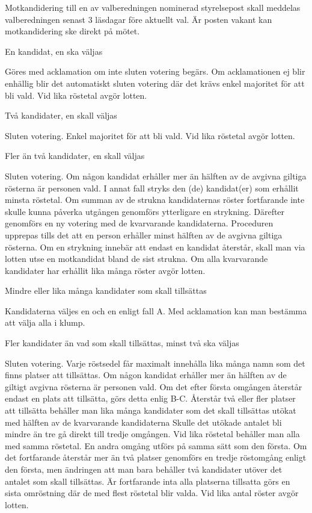 \documentclass[10pt]{article}
\begin{document}
Motkandidering till en av valberedningen nominerad styrelsepost skall meddelas valberedningen senast 3 läsdagar före aktuellt val. Är posten vakant kan motkandidering ske direkt på mötet.

\begin{alphlist}
\item En kandidat, en ska väljas

Göres med acklamation om inte sluten votering begärs. Om acklamationen ej blir
enhällig blir det automatiskt sluten votering där det krävs enkel majoritet
för att bli vald. Vid lika röstetal avgör lotten.
\item Två kandidater, en skall väljas

Sluten votering. Enkel majoritet för att bli vald. Vid lika röstetal avgör
lotten.
\item Fler än två kandidater, en skall väljas

Sluten votering. Om någon kandidat erhåller mer än hälften av de avgivna
giltiga rösterna är personen vald. I annat fall stryks den (de) kandidat(er)
som erhållit minsta röstetal. Om summan av de strukna kandidaternas röster
fortfarande inte skulle kunna påverka utgången genomförs ytterligare en
strykning. Därefter genomförs en ny votering med de kvarvarande kandidaterna.
Proceduren upprepas tills det att en person erhåller minst hälften av de
avgivna giltiga rösterna. Om en strykning innebär att endast en kandidat
återstår, skall man via lotten utse en motkandidat bland de sist strukna.
Om alla kvarvarande kandidater har erhållit lika många röster avgör lotten.
\item Mindre eller lika många kandidater som skall tillsättas

Kandidaterna väljes en och en enligt fall A. Med acklamation kan man bestämma
att välja alla i klump.
\item Fler kandidater än vad som skall tillsättas, minst två ska väljas

Sluten votering. Varje röstsedel får maximalt innehålla lika många namn som
det finns platser att tillsättas. Om någon kandidat erhåller mer än hälften
av de giltigt avgivna rösterna är personen vald. Om det efter första omgången
återstår endast en plats att tillsätta, görs detta enlig B-C. Återstår två
eller fler platser att tillsätta behåller man lika många kandidater som det
skall tillsättas utökat med hälften av de kvarvarande kandidaterna Skulle
det utökade antalet bli mindre än tre gå direkt till tredje omgången. Vid
lika röstetal behåller man alla med samma röstetal. En andra omgång utförs på
samma sätt som den första. Om det fortfarande återstår mer än två platser
genomförs en tredje röstomgång enligt den första, men ändringen att man bara
behåller två kandidater utöver det antalet som skall tillsättas. Är
fortfarande inta alla platserna tillsatta görs en sista omröstning där de med
flest röstetal blir valda. Vid lika antal röster avgör lotten.
\end{alphlist}
\end{document}

